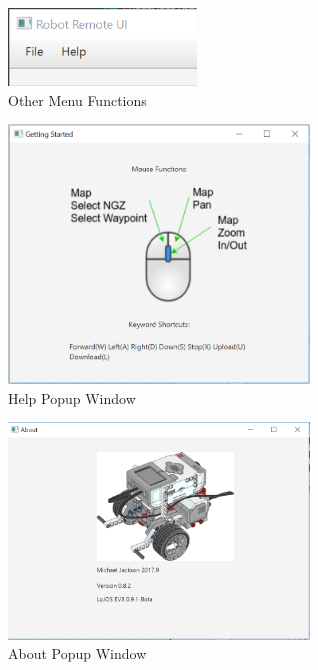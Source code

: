 \begin{figure}[H]
	\centering
	\includegraphics[width=50mm]{other.png}  
	\caption{Other Menu Functions}
	\label{fig:other topmenu}                
\end{figure}

\begin{figure}[H]
	\centering
	\includegraphics[width=80mm]{Help.png}  
	\caption{Help Popup Window}
	\label{fig:other_help}           
\end{figure}

\begin{figure}[H]
	\centering
	\includegraphics[width=80mm]{About.png}  
	\caption{About Popup Window}
	\label{fig:other_about}
\end{figure}
